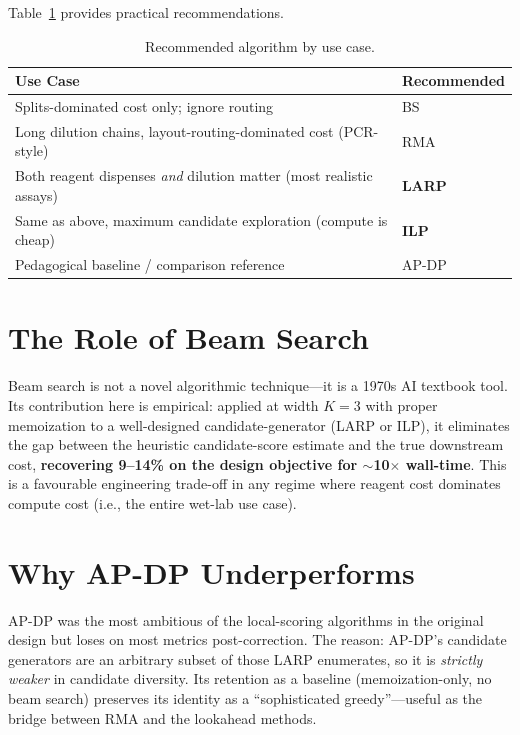 Table~\ref{tab:recommendations} provides practical recommendations.

\begin{table}[H]
\centering
\caption{Recommended algorithm by use case.}
\label{tab:recommendations}
\begin{tabular}{|p{9cm}|l|}
\hline
\textbf{Use Case} & \textbf{Recommended} \\
\hline
Splits-dominated cost only; ignore routing & BS \\
\hline
Long dilution chains, layout-routing-dominated cost (PCR-style) & RMA \\
\hline
Both reagent dispenses \textit{and} dilution matter (most realistic assays) & \textbf{LARP} \\
\hline
Same as above, maximum candidate exploration (compute is cheap) & \textbf{ILP} \\
\hline
Pedagogical baseline / comparison reference & AP-DP \\
\hline
\end{tabular}
\end{table}

\section{The Role of Beam Search}

Beam search is not a novel algorithmic technique---it is a 1970s AI textbook tool. Its contribution here is empirical: applied at width $K = 3$ with proper memoization to a well-designed candidate-generator (LARP or ILP), it eliminates the gap between the heuristic candidate-score estimate and the true downstream cost, \textbf{recovering 9--14\% on the design objective for $\sim$10$\times$ wall-time}. This is a favourable engineering trade-off in any regime where reagent cost dominates compute cost (i.e., the entire wet-lab use case).

\section{Why AP-DP Underperforms}

AP-DP was the most ambitious of the local-scoring algorithms in the original design but loses on most metrics post-correction. The reason: AP-DP's candidate generators are an arbitrary subset of those LARP enumerates, so it is \textit{strictly weaker} in candidate diversity. Its retention as a baseline (memoization-only, no beam search) preserves its identity as a ``sophisticated greedy''---useful as the bridge between RMA and the lookahead methods.

